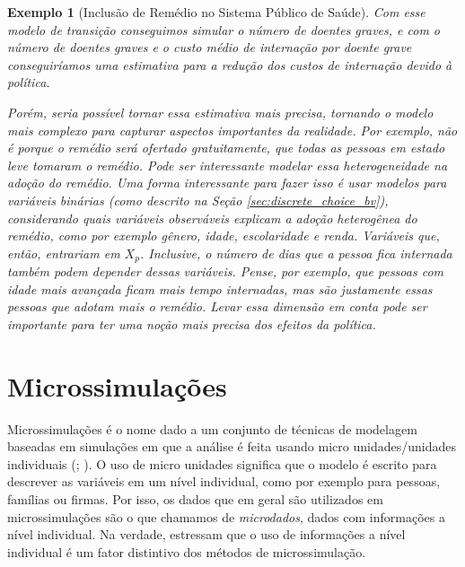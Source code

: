\documentclass[12pt, a4paper, openany]{book}
\numberwithin{equation}{chapter}
\numberwithin{table}{chapter}
\numberwithin{figure}{chapter}
\theoremstyle{break}
\newtheorem{exemplo}{Exemplo}
\begin{document}
\begin{exemplo}[Inclusão de Remédio no Sistema Público de Saúde]
Com esse modelo de transição conseguimos simular o número de doentes graves, e com o número de doentes graves e o custo médio de internação por doente grave conseguiríamos uma estimativa para a redução dos custos de internação devido à política. 

Porém, seria possível tornar essa estimativa mais precisa, tornando o modelo mais complexo para capturar aspectos importantes da realidade. Por exemplo, não é porque o remédio será ofertado gratuitamente, que todas as pessoas em estado leve tomaram o remédio. Pode ser interessante modelar essa heterogeneidade na adoção do remédio. Uma forma interessante para fazer isso é usar modelos para variáveis binárias (como descrito na Seção \ref{sec:discrete_choice_bv}), considerando quais variáveis observáveis explicam a adoção heterogênea do remédio, como por exemplo gênero, idade, escolaridade e renda. Variáveis que, então, entrariam em $X_p$. Inclusive, o número de dias que a pessoa fica internada também podem depender dessas variáveis. Pense, por exemplo, que pessoas com idade mais avançada ficam mais tempo internadas, mas são justamente essas pessoas que adotam mais o remédio. Levar essa dimensão em conta pode ser importante para ter uma noção mais precisa dos efeitos da política. 
\end{exemplo}


\section{Microssimulações}
\label{sec:microssimulacao_intro}
Microssimulações é o nome dado a um conjunto de técnicas de modelagem baseadas em simulações em que a análise é feita usando micro unidades/unidades individuais (\cite[capítulo~1]{odonoghue2021}; \cite{figari2015}). O uso de micro unidades significa que o modelo é escrito para descrever as variáveis em um nível individual, como por exemplo para pessoas, famílias ou firmas. Por isso, os dados que em geral são utilizados em microssimulações são o que chamamos de \textit{microdados}, dados com informações a nível individual. Na verdade, \textcite[capítulo~1]{mitton2000microsimulation} estressam que o uso de informações a nível individual é um fator distintivo dos métodos de microssimulação. 
\end{document}
